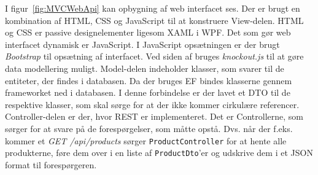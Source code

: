 I figur~\ref{fig:MVCWebApi} kan opbygning af web interfacet ses. 
Der er brugt en kombination af HTML, CSS og JavaScript til at konstruere View-delen. HTML og CSS er passive designelementer ligesom \gls{XAML} i \gls{WPF}. Det som gør web interfacet dynamisk er JavaScript. I JavaScript opsætningen er der brugt \textit{Bootstrap} til opsætning af interfacet. Ved siden af bruges \textit{knockout.js} til at gøre data modellering muligt.
\newline\newline
Model-delen indeholder klasser, som svarer til de entiteter, der findes i databasen. Da der bruges \gls{EF} bindes klasserne gennem frameworket ned i databasen. I denne forbindelse er der lavet et \gls{DTO} til de respektive klasser, som skal sørge for at der ikke kommer cirkulære referencer. 
\newline\newline
Controller-delen er der, hvor \gls{REST} er implementeret. Det er Controllerne, som sørger for at svare på de forespørgelser, som måtte opstå. Dvs. når der f.eks. kommer et \textit{GET /api/products} sørger \texttt{ProductController} for at hente alle produkterne, føre dem over i en liste af \texttt{ProductDto}'er og udskrive dem i et JSON format til forespørgeren.